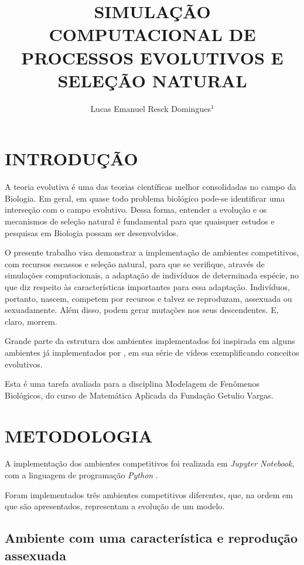 \documentclass[10pt,brazil,english]{article}
\title{SIMULAÇÃO COMPUTACIONAL DE PROCESSOS EVOLUTIVOS E SELEÇÃO NATURAL}
\author{Lucas Emanuel Resck Domingues$^{1}$}
\begin{document}
    \pagestyle{fancy} %
    
    \maketitle
    \newpage
    
    \section{\uppercase{Introdução}}
    
    A teoria evolutiva é uma das teorias científicas melhor consolidadas no campo da Biologia. Em geral, em quase todo problema biológico pode-se identificar uma interseção com o campo evolutivo. Dessa forma, entender a evolução e os mecanismos de seleção natural é fundamental para que quaisquer estudos e pesquisas em Biologia possam ser desenvolvidos.
    
    O presente trabalho visa demonstrar a implementação de ambientes competitivos, com recursos escassos e seleção natural, para que se verifique, através de simulações computacionais, a adaptação de indivíduos de determinada espécie, no que diz respeito às características importantes para essa adaptação. Indivíduos, portanto, nascem, competem por recursos e talvez se reproduzam, assexuada ou sexuadamente. Além disso, podem gerar mutações nos seus descendentes. E, claro, morrem.
    
    Grande parte da estrutura dos ambientes implementados foi inspirada em alguns ambientes já implementados por , em sua série de vídeos exemplificando conceitos evolutivos.
    
    Esta é uma tarefa avaliada para a disciplina Modelagem de Fenômenos Biológicos, do curso de Matemática Aplicada da Fundação Getulio Vargas.
    
    \section{\uppercase{Metodologia}}
    
    A implementação dos ambientes competitivos foi realizada em \textit{Jupyter Notebook}, com a linguagem de programação \textit{Python} \cite{Lucas2019}.
    
    Foram implementados três ambientes competitivos diferentes, que, na ordem em que são apresentados, representam a evolução de um modelo.
    
        \subsection{Ambiente com uma característica e reprodução assexuada}
        
\end{document}
